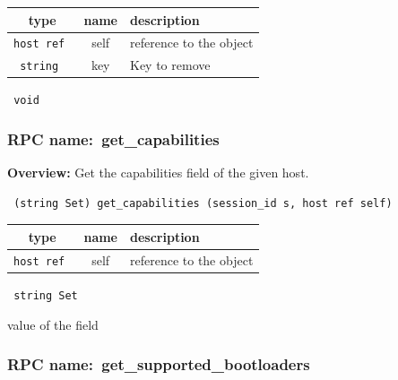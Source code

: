 
 
\vspace{0.3cm}
\begin{tabular}{|c|c|p{7cm}|}
 \hline
{\bf type} & {\bf name} & {\bf description} \\ \hline
{\tt host ref } & self & reference to the object \\ \hline 

{\tt string } & key & Key to remove \\ \hline 

\end{tabular}

\vspace{0.3cm}

{\tt 
void
}



\vspace{0.3cm}
\vspace{0.3cm}
\vspace{0.3cm}
\subsubsection{RPC name:~get\_capabilities}

{\bf Overview:} 
Get the capabilities field of the given host.

\begin{verbatim} (string Set) get_capabilities (session_id s, host ref self)\end{verbatim}



 
\vspace{0.3cm}
\begin{tabular}{|c|c|p{7cm}|}
 \hline
{\bf type} & {\bf name} & {\bf description} \\ \hline
{\tt host ref } & self & reference to the object \\ \hline 

\end{tabular}

\vspace{0.3cm}

{\tt 
string Set
}


value of the field
\vspace{0.3cm}
\vspace{0.3cm}
\vspace{0.3cm}
\subsubsection{RPC name:~get\_supported\_bootloaders}

